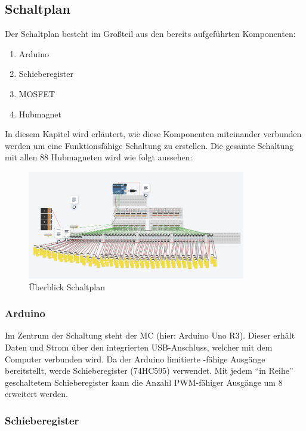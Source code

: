 \subsection{Schaltplan} \label{subsec:schaltplan}

Der Schaltplan besteht im Großteil aus den bereits aufgeführten Komponenten:
\begin{enumerate}
	\item Arduino
	\item Schieberegister
	\item MOSFET
	\item Hubmagnet
\end{enumerate}
In diesem Kapitel wird erläutert, wie diese Komponenten miteinander verbunden werden um eine Funktionsfähige
Schaltung zu erstellen. Die gesamte Schaltung mit allen 88 Hubmagneten wird wie folgt aussehen:
\begin{figure}[htbp]
	\centering
	\includegraphics [width=0.85\textwidth] {img/SchaltungGesamt}
	\caption{Überblick Schaltplan}
	\label{img:Schaltplan}
\end{figure}
\subsubsection{Arduino}

Im Zentrum der Schaltung steht der \ac{MC} (hier: Arduino Uno R3).
Dieser erhält Daten und Strom über den integrierten USB-Anschluss, welcher mit dem Computer verbunden wird.
Da der Arduino limitierte -fähige Ausgänge bereitstellt, werde Schieberegister (74HC595) verwendet.
Mit jedem \enquote{in Reihe} geschaltetem Schieberegister kann die Anzahl \ac{PWM}-fähiger Ausgänge um 8 erweitert werden.

\subsubsection{Schieberegister}

